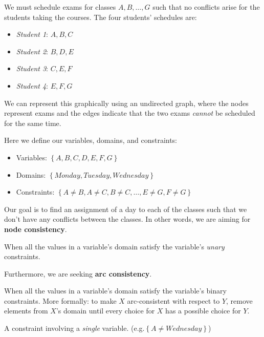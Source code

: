 \begin{problem}
	We must schedule exams for classes \({A, B, \ldots , G}\) such that no conflicts arise for the students taking the courses. The four students' schedules are:
	\begin{itemize}
		\item \emph{Student 1}: \({A, B, C}\)
		\item \emph{Student 2}: \({B, D, E}\) 
		\item \emph{Student 3}: \({C, E, F}\) 
		\item \emph{Student 4}: \({E, F, G}\) 
	\end{itemize}
	We can represent this graphically using an undirected graph, where the nodes represent exams and the edges indicate that the two exams \emph{cannot} be scheduled for the same time.
	\begin{figure}[H]
		\centering
		\label{fig:csgraph}
	\end{figure}
	Here we define our variables, domains, and constraints:
	\begin{itemize}
		\item Variables: \(\left\{ A,B,C,D,E,F,G \right\} \)
		\item Domains: \(\left\{ {Monday, Tuesday, Wednesday} \right\} \) 
		\item Constraints: \(\left\{ A \neq B, A \neq C, B \neq C, \ldots , E \neq G, F \neq G \right\} \)  
	\end{itemize}
	Our goal is to find an assignment of a day to each of the classes such that we don't have any conflicts between the classes. In other words, we are aiming for \textbf{node consistency}.
	\begin{definition}
		When all the values in a variable's domain satisfy the variable's \emph{unary} constraints.
	\end{definition}
	Furthermore, we are seeking \textbf{arc consistency}.
	\begin{definition}
		When all the values in a variable's domain satisfy the variable's binary constraints. More formally: to make \(X\) arc-consistent with respect to \(Y\), remove elements from \(X\)'s domain until every choice for \(X\) has a possible choice for \(Y\). 
	\end{definition}
\end{problem}

\begin{definition}
	A constraint involving a \emph{single} variable. (e.g.\(\left\{ A \neq Wednesday \right\} \))
\end{definition}

